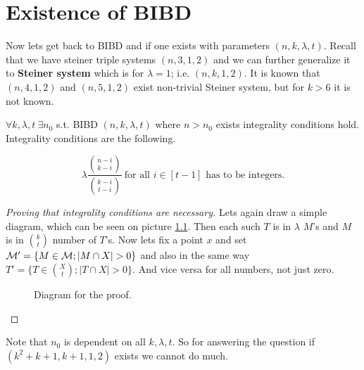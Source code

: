 \chapter{Existence of BIBD}

Now lets get back to BIBD and if one exists with parameters $(n,k,\lambda,t)$. Recall that we have steiner triple systems $(n,3,1,2)$ and we can further generalize it to \textbf{Steiner system} which is for $\lambda = 1$; i.e. $(n,k,1,2)$. It is known that $(n,4,1,2)$ and $(n,5,1,2)$ exist non-trivial Steiner system, but for $k > 6$ it is not known.

\begin{thm}[P. Keevash]
	$\forall k, \lambda, t \ \exists n_0$ s.t. BIBD $(n,k,\lambda, t)$ where $n > n_0$ exists \ifft integrality conditions hold. Integrality conditions are the following.
	
	$$
	\lambda \frac{\binom{n - i}{k-i}}{\binom{k-i}{t-i}} \ \text{for all } i \in [t-1] \text{ has to be integers.}
	$$
\end{thm}

\begin{proof}[Proving that integrality conditions are necessary]
	Lets again draw a simple diagram, which can be seen on picture \ref{nec-integr-cond}. Then each such $T$ is in $\lambda$ $M$'s and $M$ is in $\binom{k}{t}$ number of $T$'s. Now lets fix a point $x$ and set $\mathcal{M}' = \{M \in \mathcal{M}; |M \cap X| > 0\}$ and also in the same way $T' = \{T \in \binom{X}{t}; |T \cap X| > 0\}$. And vice versa for all numbers, not just zero.
	
	\begin{figure}[!ht]\centering
		\caption{Diagram for the proof.}
		\label{nec-integr-cond}
	\end{figure}
\end{proof}

Note that $n_0$ is dependent on all $k,\lambda,t$. So for answering the question if $(k^2 + k +1, k+1, 1, 2)$ exists we cannot do much.

